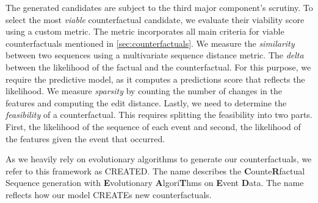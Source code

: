 \documentclass[./../../paper.tex]{subfiles}
\begin{document}
The generated candidates are subject to the third major component's scrutiny. 
To select the most \emph{viable} counterfactual candidate, we evaluate their viability score using a custom metric. 
The metric incorporates all main criteria for viable counterfactuals mentioned in \autoref{sec:counterfactuals}. 
We measure the \emph{similarity} between two sequences using a multivariate sequence distance metric. The \emph{delta} between the likelihood of the factual and the counterfactual. For this purpose, we require the predictive model, as it computes a predictions score that reflects the likelihood. 
We measure \emph{sparsity} by counting the number of changes in the features and computing the edit distance. Lastly, we need to determine the \emph{feasibility} of a counterfactual. This requires splitting the feasibility into two parts. First, the likelihood of the sequence of each event and second, the likelihood of the features given the event that occurred.

As we heavily rely on evolutionary algorithms to generate our counterfactuals, we refer to this framework as CREATED. The name describes the \textbf{C}ounte\textbf{R}factual Sequence generation with \textbf{E}volutionary \textbf{A}lgori\textbf{T}hms on \textbf{E}vent \textbf{D}ata. The name reflects how our model CREATEs new counterfactuals.
\end{document}
